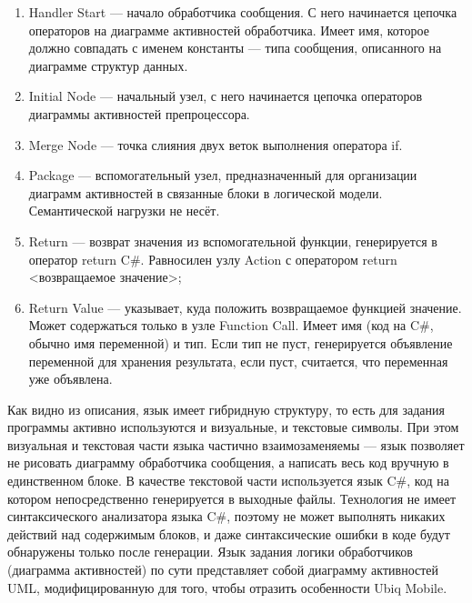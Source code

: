 \begin{enumerate}
\begin{enumerate}
			\item Handler Start --- начало обработчика сообщения. С него начинается цепочка 
				операторов на диаграмме активностей обработчика. Имеет имя, которое должно 
				совпадать с именем константы --- типа сообщения, описанного на диаграмме структур 
				данных.
			\item Initial Node --- начальный узел, с него начинается цепочка операторов 
				диаграммы активностей препроцессора.
			\item Merge Node --- точка слияния двух веток выполнения оператора if.
			\item Package --- вспомогательный узел, предназначенный для организации диаграмм 
				активностей в связанные блоки в логической модели. Семантической нагрузки не несёт.
			\item Return --- возврат значения из вспомогательной функции, генерируется в 
				оператор return C\#. Равносилен узлу Action с оператором return <возвращаемое значение>;
			\item Return Value --- указывает, куда положить возвращаемое функцией значение. 
				Может содержаться только в узле Function Call. Имеет имя (код на C\#, обычно 
				имя переменной) и тип. Если тип не пуст, генерируется объявление переменной 
				для хранения результата, если пуст, считается, что переменная уже объявлена.
		\end{enumerate}
\end{enumerate}


Как видно из описания, язык имеет гибридную структуру, то есть для задания программы 
активно используются и визуальные, и текстовые символы. При этом визуальная и текстовая 
части языка частично взаимозаменяемы --- язык позволяет не рисовать диаграмму обработчика 
сообщения, а написать весь код вручную в единственном блоке. В качестве текстовой 
части используется язык C\#, код на котором непосредственно генерируется в выходные 
файлы. Технология не имеет синтаксического анализатора языка C\#, поэтому не может 
выполнять никаких действий над содержимым блоков, и даже синтаксические ошибки в коде 
будут обнаружены только после генерации. Язык задания логики обработчиков (диаграмма 
активностей) по сути представляет собой диаграмму активностей UML, модифицированную 
для того, чтобы отразить особенности Ubiq Mobile.

